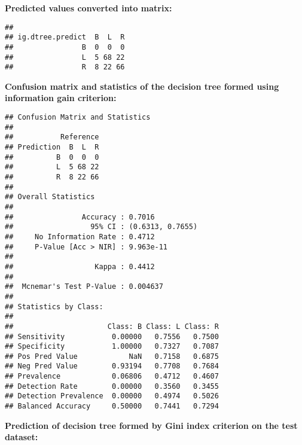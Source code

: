 \documentclass[
]{article}
\newenvironment{Shaded}{\begin{snugshade}}{\end{snugshade}}
\newcommand{\KeywordTok}[1]{\textcolor[rgb]{0.13,0.29,0.53}{\textbf{#1}}}
\newcommand{\NormalTok}[1]{#1}
\newcommand{\OperatorTok}[1]{\textcolor[rgb]{0.81,0.36,0.00}{\textbf{#1}}}
\begin{document}
\textbf{Predicted values converted into matrix:}

\begin{Shaded}
\end{Shaded}

\begin{verbatim}
##                 
## ig.dtree.predict  B  L  R
##                B  0  0  0
##                L  5 68 22
##                R  8 22 66
\end{verbatim}

\textbf{Confusion matrix and statistics of the decision tree formed
using information gain criterion:}

\begin{Shaded}
\end{Shaded}

\begin{verbatim}
## Confusion Matrix and Statistics
## 
##           Reference
## Prediction  B  L  R
##          B  0  0  0
##          L  5 68 22
##          R  8 22 66
## 
## Overall Statistics
##                                           
##                Accuracy : 0.7016          
##                  95% CI : (0.6313, 0.7655)
##     No Information Rate : 0.4712          
##     P-Value [Acc > NIR] : 9.963e-11       
##                                           
##                   Kappa : 0.4412          
##                                           
##  Mcnemar's Test P-Value : 0.004637        
## 
## Statistics by Class:
## 
##                      Class: B Class: L Class: R
## Sensitivity           0.00000   0.7556   0.7500
## Specificity           1.00000   0.7327   0.7087
## Pos Pred Value            NaN   0.7158   0.6875
## Neg Pred Value        0.93194   0.7708   0.7684
## Prevalence            0.06806   0.4712   0.4607
## Detection Rate        0.00000   0.3560   0.3455
## Detection Prevalence  0.00000   0.4974   0.5026
## Balanced Accuracy     0.50000   0.7441   0.7294
\end{verbatim}

\textbf{Prediction of decision tree formed by Gini index criterion on
the test dataset:}
\end{document}
